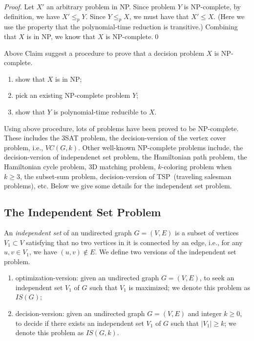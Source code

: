 \documentclass[letterpaper,11pt]{article}
\theoremstyle{mytheorem}
\begin{document}
\emph{Proof.} Let $X'$ an arbitrary problem in NP. Since problem $Y$ is NP-complete,
by definition, we have $X' \le_p Y$. Since $Y\le_p X$, we must have that $X'\le X$.
(Here we use the property that the polynomial-time reduction is transitive.)
Combining that $X$ is in NP, we know that $X$ is NP-complete.\qed

Above Claim suggest a procedure to prove that a decision problem $X$ is NP-complete.
\vspace*{-\topsep}
\begin{enumerate}
\item show that $X$ is in NP;
\item pick an existing NP-complete problem $Y$;
\item show that $Y$ is polynomial-time reducible to $X$. 
\end{enumerate}

Using above procedure, lots of problems have been proved to be NP-complete.
These includes the 3SAT problem, the decision-version of the vertex cover problem, i.e., $VC(G,k)$.
Other well-known NP-complete problems include, the decision-version of independenet set problem,
the Hamiltonian path problem, 
the Hamiltonian cycle problem, 
3D matching problem, $k$-coloring problem when $k\ge 3$, the subset-sum problem, decision-version of TSP~(traveling salesman problems), etc.
Below we give some details for the independent set problem.

\subsection*{The Independent Set Problem}

An \emph{independent set} of an undirected graph $G = (V, E)$
is a subset of vertices $V_1\subset V$ satisfying that no two vertices in it is connected by an edge, i.e.,
for any $u,v\in V_1$, we have $(u,v)\not\in E$. We define two versions of the independent set problem.
\vspace*{-\topsep}
\begin{enumerate}
\item optimization-version: given an undirected graph $G = (V, E)$, to seek an independent set $V_1$ of $G$ such that $V_1$ is maximized; we denote this problem as $IS(G)$;
\item decision-version: given an undirected graph $G = (V, E)$ and integer $k\ge 0$, to decide if there exists an independent set $V_1$ of $G$ such that $|V_1| \ge k$;
we denote this problem as $IS(G,k)$.
\end{enumerate}
\end{document}
